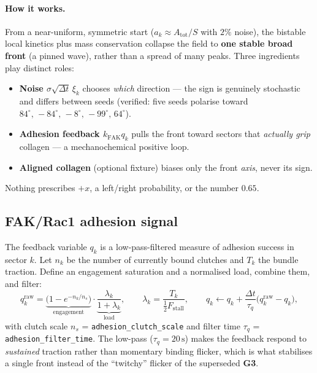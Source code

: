 \documentclass[11pt]{article}
\newcommand{\dt}{\Delta t}
\newcommand{\GThree}{\textcolor{g3col}{\textbf{G3}}}
\newcommand{\code}[1]{\texttt{\small #1}}
\begin{document}
\paragraph{How it works.} From a near-uniform, symmetric start
($a_k \approx A_{\text{tot}}/S$ with $2\%$ noise), the bistable local kinetics plus mass
conservation collapse the field to \textbf{one stable broad front} (a pinned wave), rather than a
spread of many peaks. Three ingredients play distinct roles:
\begin{itemize}[leftmargin=1.4em,itemsep=2pt]
  \item \textbf{Noise $\sigma\sqrt{\dt}\,\xi_k$} chooses \emph{which} direction --- the sign is
        genuinely stochastic and differs between seeds (verified: five seeds polarise toward
        $84^\circ,\,-84^\circ,\,-8^\circ,\,-99^\circ,\,64^\circ$).
  \item \textbf{Adhesion feedback $k_{\text{FAK}}q_k$} pulls the front toward sectors that
        \emph{actually grip} collagen --- a mechanochemical positive loop.
  \item \textbf{Aligned collagen} (optional fixture) biases only the front \emph{axis}, never its
        sign.
\end{itemize}
Nothing prescribes $+x$, a left/right probability, or the number $0.65$.

\subsection{FAK/Rac1 adhesion signal}
\label{sec:fak}

The feedback variable $q_k$ is a low-pass-filtered measure of adhesion success in sector $k$. Let
$n_k$ be the number of currently bound clutches and $T_k$ the bundle traction. Define an
engagement saturation and a normalised load, combine them, and filter:
\begin{equation}
  q_k^{\text{raw}} = \underbrace{\bigl(1-e^{-n_k/n_s}\bigr)}_{\text{engagement}}\cdot
  \underbrace{\frac{\lambda_k}{1+\lambda_k}}_{\text{load}},
  \qquad
  \lambda_k = \frac{T_k}{\tfrac12 F_{\text{stall}}},
  \qquad
  q_k \leftarrow q_k + \frac{\dt}{\tau_q}\bigl(q_k^{\text{raw}}-q_k\bigr),
  \label{eq:fak}
\end{equation}
with clutch scale $n_s$ = \code{adhesion\_clutch\_scale} and filter time $\tau_q$ =
\code{adhesion\_filter\_time}. The low-pass ($\tau_q=20\,\text{s}$) makes the feedback respond to
\emph{sustained} traction rather than momentary binding flicker, which is what stabilises a single
front instead of the ``twitchy'' flicker of the superseded \GThree.
\end{document}
